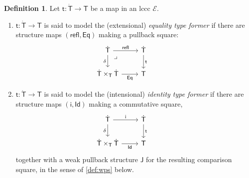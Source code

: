 \documentclass[12pt,reqno]{amsart}
\newcommand{\EE}{\ensuremath{\mathcal{E}}}
\renewcommand{\to}{\ensuremath{\rightarrow}}
\newcommand{\refl}{\mathsf{refl}}
\renewcommand{\t}{\ensuremath{\mathsf{t}}}
\newcommand{\tT}{\ensuremath{{\t}:\TT\to\T}}
\newcommand{\T}{\ensuremath{\mathsf{T}}}
\newcommand{\TT}{\ensuremath{\dot{\mathsf{T}}}}
\newcommand{\pbcorner}{\arrow[dr,phantom,"\lrcorner" very near start, shift right=.5ex]} %
\theoremstyle{remark}
\theoremstyle{definition}
\newtheorem{definition}[theorem]{Definition}
\begin{document}
\begin{definition}\label{def:EqualityandIdentityTypes}
Let $\tT$ be a map in an lccc $\EE$. 
\begin{enumerate}
\item\label{def:equalitytype}  $\tT$ is said to  model the (extensional) \emph{equality type former} if there are structure maps $(\refl, \mathsf{Eq})$ making a pullback square:
\begin{equation*}\label{diag:Eqtypes}
\begin{tikzcd}
	\TT \ar[r,"\refl"] \ar[d,swap,"\delta"] \pbcorner &  \TT \ar[d, "\t"]\\  
	\TT \times_\T \TT \ar[r, swap,"\mathsf{Eq}"] & \T
 \end{tikzcd}\qquad \qquad 
 \end{equation*}
\item\label{def:identitytype}   $\tT$ is said to model the (intensional) \emph{identity type former} if there are structure maps $(\mathsf{i}, \mathsf{Id})$ making a commutative square,
\begin{equation}\label{diag:Idtypes}
\begin{tikzcd}
	\TT \ar[r,"\mathsf{i}"] \ar[d,swap,"\delta"] &  \TT \ar[d, "\t"]\\  
	\TT \times_\T \TT \ar[r, swap,"\mathsf{Id}"] & \T
 \end{tikzcd}\qquad \qquad 
 \end{equation}
 together with a weak pullback structure $\mathsf{J}$ for the resulting comparison square, in the sense of \eqref{def:wps} below. 
 \end{enumerate}
   \end{definition}
\end{document}
